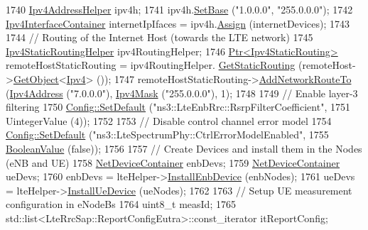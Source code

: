 \begin{DoxyCode}
1740   \hyperlink{classns3_1_1Ipv4AddressHelper}{Ipv4AddressHelper} ipv4h;
1741   ipv4h.\hyperlink{classns3_1_1Ipv4AddressHelper_acf7b16dd25bac67e00f5e25f90a9a035}{SetBase} (\textcolor{stringliteral}{"1.0.0.0"}, \textcolor{stringliteral}{"255.0.0.0"});
1742   \hyperlink{classns3_1_1Ipv4InterfaceContainer}{Ipv4InterfaceContainer} internetIpIfaces = ipv4h.\hyperlink{classns3_1_1Ipv4AddressHelper_af8e7f4a1a7e74c00014a1eac445a27af}{Assign} (internetDevices);
1743 
1744   \textcolor{comment}{// Routing of the Internet Host (towards the LTE network)}
1745   \hyperlink{classns3_1_1Ipv4StaticRoutingHelper}{Ipv4StaticRoutingHelper} ipv4RoutingHelper;
1746   \hyperlink{classns3_1_1Ptr}{Ptr<Ipv4StaticRouting>} remoteHostStaticRouting = ipv4RoutingHelper.
      \hyperlink{classns3_1_1Ipv4StaticRoutingHelper_a731206e50d305695dac7fb2ef963a4bb}{GetStaticRouting} (remoteHost->\hyperlink{classns3_1_1Object_a13e18c00017096c8381eb651d5bd0783}{GetObject}<\hyperlink{classns3_1_1Ipv4}{Ipv4}> ());
1747   remoteHostStaticRouting->\hyperlink{classns3_1_1Ipv4StaticRouting_a8bf5eaa7ba49fe33c78c70d5560b6c39}{AddNetworkRouteTo} (\hyperlink{classns3_1_1Ipv4Address}{Ipv4Address} (\textcolor{stringliteral}{"7.0.0.0"}), 
      \hyperlink{classns3_1_1Ipv4Mask}{Ipv4Mask} (\textcolor{stringliteral}{"255.0.0.0"}), 1);
1748 
1749   \textcolor{comment}{// Enable layer-3 filtering}
1750   \hyperlink{group__config_ga2e7882df849d8ba4aaad31c934c40c06}{Config::SetDefault} (\textcolor{stringliteral}{"ns3::LteEnbRrc::RsrpFilterCoefficient"},
1751                       UintegerValue (4));
1752 
1753   \textcolor{comment}{// Disable control channel error model}
1754   \hyperlink{group__config_ga2e7882df849d8ba4aaad31c934c40c06}{Config::SetDefault} (\textcolor{stringliteral}{"ns3::LteSpectrumPhy::CtrlErrorModelEnabled"},
1755                       \hyperlink{classns3_1_1BooleanValue}{BooleanValue} (\textcolor{keyword}{false}));
1756 
1757   \textcolor{comment}{// Create Devices and install them in the Nodes (eNB and UE)}
1758   \hyperlink{classns3_1_1NetDeviceContainer}{NetDeviceContainer} enbDevs;
1759   \hyperlink{classns3_1_1NetDeviceContainer}{NetDeviceContainer} ueDevs;
1760   enbDevs = lteHelper->\hyperlink{classns3_1_1LteHelper_a5e009ad35ef85f46b5a6099263f15a03}{InstallEnbDevice} (enbNodes);
1761   ueDevs = lteHelper->\hyperlink{classns3_1_1LteHelper_ac9cd932d7de92811cfa953c2e3b2fc9f}{InstallUeDevice} (ueNodes);
1762 
1763   \textcolor{comment}{// Setup UE measurement configuration in eNodeBs}
1764   uint8\_t measId;
1765   std::list<LteRrcSap::ReportConfigEutra>::const\_iterator itReportConfig;

\end{DoxyCode}
